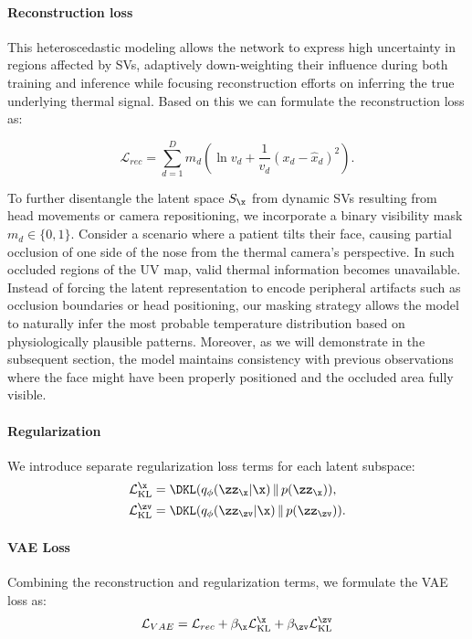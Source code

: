 \paragraph{Reconstruction loss}
This heteroscedastic modeling allows the network to express high uncertainty in regions affected by SVs, adaptively down-weighting their influence during both training and inference while focusing reconstruction efforts on inferring the true underlying thermal signal. Based on this we can formulate the reconstruction loss as:

\begin{equation}
  \mathcal{L}_{rec} = \sum_{d=1}^{D} m_d \left( \ln{v_d} + \frac{1}{v_d}(x_d - \hat{x}_d)^2 \right).
\end{equation}

To further disentangle the latent space $S_\x$ from dynamic SVs resulting from head movements or camera repositioning, we incorporate a binary visibility mask $m_d \in \{0,1\}$. Consider a scenario where a patient tilts their face, causing partial occlusion of one side of the nose from the thermal camera's perspective. In such occluded regions of the UV map, valid thermal information becomes unavailable. Instead of forcing the latent representation to encode peripheral artifacts such as occlusion boundaries or head positioning, our masking strategy allows the model to naturally infer the most probable temperature distribution based on physiologically plausible patterns. Moreover, as we will demonstrate in the subsequent section, the model maintains consistency with previous observations where the face might have been properly positioned and the occluded area fully visible.
\paragraph{Regularization}
We introduce separate regularization loss terms for each latent subspace:
\begin{align}
  \mathcal{L}_{\text{KL}}^{\x}  & =  \DKL(q_{\phi}(\zz_{\x}|\x) \, \| \, p(\zz_{\x})),  \\
  \mathcal{L}_{\text{KL}}^{\zv} & = \DKL(q_{\phi}(\zz_{\zv}|\x) \, \| \, p(\zz_{\zv})).
\end{align}

\paragraph{VAE Loss}
Combining the reconstruction and regularization terms, we formulate the VAE loss as:
\begin{equation}
  \mathcal{L}_{VAE} =  \mathcal{L}_{rec} + \beta_{\x}\mathcal{L}_{\text{KL}}^{\x} + \beta_{\zv} \mathcal{L}_{\text{KL}}^{\zv}
\end{equation}

